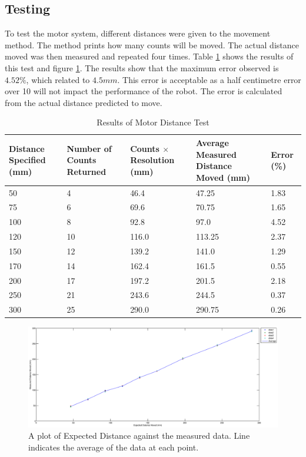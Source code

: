 \subsection{Testing}\label{Section:MotorTest}

To test the motor system, different distances were given to the movement method. The method prints how many counts will be moved. The actual distance moved was then measured and repeated four times. Table \ref{table:results:motor:distance} shows the results of this test and figure \ref{fig:results:motor:distance}. The results show that the maximum error observed is $4.52\%$, which related to $4.5mm$. This error is acceptable as a half centimetre error over 10 will not impact the performance of the robot. The error is calculated from the actual distance predicted to move. 


\begin{table}
\caption{Results of Motor Distance Test}
\label{table:results:motor:distance}
\begin{tabular}{|p{2.5cm}|p{2.5cm}|p{2.5cm}|p{2.5cm}|p{2.5cm}|} \hline
Distance Specified (mm) &	Number of Counts Returned	& 	Counts $\times$ Resolution (mm)	& 	Average Measured Distance Moved (mm)	&	Error (\%) \\ \hline
50						&	4							&	46.4							&	47.25									&	1.83		\\
75						&	6							&	69.6							&	70.75									&	1.65		\\
100						&	8							&	92.8							&	97.0									&	4.52		\\
120						&	10							&	116.0							&	113.25									&	2.37		\\
150						&	12							&	139.2							&	141.0									&	1.29		\\
170						&	14							&	162.4							&	161.5									&	0.55		\\
200						&	17							&	197.2							&	201.5									&	2.18		\\
250						&	21							&	243.6							&	244.5									&	0.37		\\
300						&	25							&	290.0							&	290.75									&	0.26		\\ \hline
\end{tabular}
\end{table}

\begin{figure}
\includegraphics[width=\textwidth]{Figures/Motor_Distance.eps}
\caption{A plot of Expected Distance against the measured data. Line indicates the average of the data at each point.}
\label{fig:results:motor:distance}
\end{figure}


